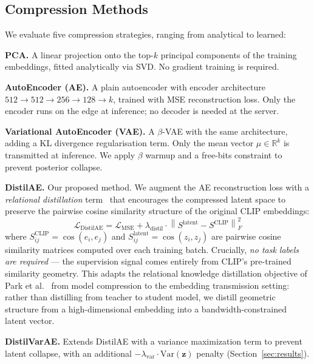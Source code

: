 \subsection{Compression Methods}
\label{sec:compression}

We evaluate five compression strategies, ranging from analytical to learned:

\textbf{PCA.} A linear projection onto the top-$k$ principal components of the training embeddings, fitted analytically via SVD. No gradient training is required.

\textbf{AutoEncoder (AE).} A plain autoencoder with encoder architecture $512 \to 512 \to 256 \to 128 \to k$, trained with MSE reconstruction loss. Only the encoder runs on the edge at inference; no decoder is needed at the server.

\textbf{Variational AutoEncoder (VAE).} A $\beta$-VAE with the same architecture, adding a KL divergence regularisation term. Only the mean vector $\mu \in \mathbb{R}^{k}$ is transmitted at inference. We apply $\beta$ warmup and a free-bits constraint to prevent posterior collapse.

\textbf{DistilAE.} Our proposed method. We augment the AE reconstruction loss with a \emph{relational distillation} term~\cite{park2019relational} that encourages the compressed latent space to preserve the pairwise cosine similarity structure of the original CLIP embeddings:
\begin{equation}
    \mathcal{L}_{\text{DistilAE}} = \mathcal{L}_{\text{MSE}} + \lambda_{\text{distil}} \cdot \left\| S^{\text{latent}} - S^{\text{CLIP}} \right\|_F^2
\end{equation}
where $S^{\text{CLIP}}_{ij} = \cos(e_i, e_j)$ and $S^{\text{latent}}_{ij} = \cos(z_i, z_j)$ are pairwise cosine similarity matrices computed over each training batch. Crucially, \emph{no task labels are required} — the supervision signal comes entirely from CLIP's pre-trained similarity geometry. This adapts the relational knowledge distillation objective of Park et al.~\cite{park2019relational} from model compression to the embedding transmission setting: rather than distilling from teacher to student model, we distill geometric structure from a high-dimensional embedding into a bandwidth-constrained latent vector.

\textbf{DistilVarAE.} Extends DistilAE with a variance maximization term to prevent latent collapse, with an additional $-\lambda_{\text{var}} \cdot \text{Var}(\mathbf{z})$ penalty (Section~\ref{sec:results}).

